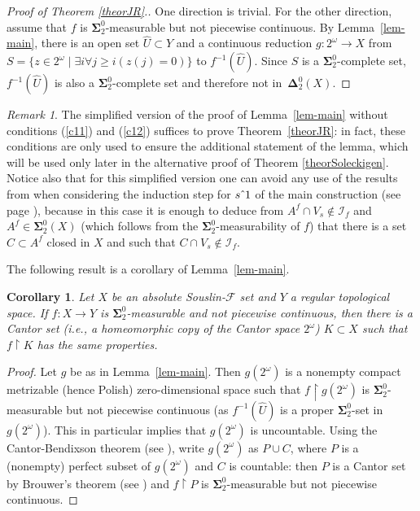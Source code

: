 \documentclass{raex}
\theoremstyle{plain}
\newtheorem{cor}[thm]{Corollary}
\theoremstyle{definition}
\theoremstyle{remark}
\newtheorem*{rem*}{Remark}
\def\D{\mathbf{\Delta}}
\def\S{\mathbf{\Sigma}}
\def\F{\mathcal{F}}
\def\I{\mathcal{I}}
\def\conc{\hat{\hbox to .4em{}}}
\begin{document}
\begin{proof}[Proof of Theorem \ref{theorJR}.]
One direction is trivial. For the other direction, assume that $f$ is $\S^0_2$-measurable but not piecewise continuous. By Lemma~\ref{lem-main}, there is an open set $\widehat{U}\subset Y$ and a continuous reduction $g \colon 2^\omega\to X$ from $S=\{z\in 2^\omega \mid \exists i\forall j\ge i(z(j)=0)\}$ to $f^{-1}(\widehat{U})$. Since $S$ is a $\S^0_2$-complete set, $f^{-1}(\widehat{U})$ is also a $\S^0_2$-complete set and therefore not in~$\D^0_2(X)$.
\end{proof}


\begin{rem*}
The simplified version of the proof of Lemma~\ref{lem-main} without conditions (\ref{c11}) and (\ref{c12}) suffices to prove Theorem~\ref{theorJR}: in fact, these conditions are only used to ensure the additional statement of the lemma, which will be used only later in the alternative proof of Theorem \ref{theorSoleckigen}. Notice also that for this simplified version one can avoid any use of the results from \cite{jaynerogers} when considering the induction step for $s \conc 1$ of the main construction (see page \pageref{inductionstep}), because in this case it is enough to deduce from $A^f \cap V_s \notin \I_f$ and $A^f \in \S^0_2(X)$ (which follows from the $\S^0_2$-measurability of $f$) that there is a set $C \subset A^f$ closed in $X$ and such that $C \cap V_s \notin \I_f$.
\end{rem*}


The following result is a corollary of Lemma~\ref{lem-main}.

\begin{cor}\label{cor}
Let $X$ be an absolute Souslin-$\F$ set and $Y$ a regular topological space. If $f \colon X\to Y$ is $\S^0_2$-measurable and not piecewise continuous, then there is a Cantor set (i.e., a homeomorphic copy of the Cantor space $2^\omega$) $K \subset X$ such that $f \restriction K$ has the same properties. 
\end{cor}

\begin{proof}
Let $g$ be as in Lemma~\ref{lem-main}. Then $g(2^\omega)$ is a nonempty compact metrizable (hence Polish) zero-dimensional space such that $f \restriction g(2^\omega)$ is $\S^0_2$-measurable but not piecewise continuous (as $f^{-1}(\widehat{U})$ is a proper $\S^0_2$-set in $g(2^\omega)$). This in particular implies that $g(2^\omega)$ is uncountable. Using the Cantor-Bendixson theorem (see \cite[Theorem~6.4]{kechris}), write $g(2^\omega)$ as $P \cup C$, where $P$ is a (nonempty) perfect subset of $g(2^\omega)$ and $C$ is countable: then $P$ is a Cantor set by Brouwer's theorem (see \cite[Theorem 7.4]{kechris}) and $f \restriction P$ is $\S^0_2$-measurable but not piecewise continuous.
\end{proof}
\end{document}
